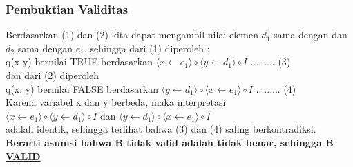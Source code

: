 \documentclass[handout]{beamer}
\theoremstyle{definition}
\theoremstyle{example}
\begin{document}
\begin{frame}
	\frametitle{Pembuktian Validitas}
	Berdasarkan (1) dan (2) kita dapat mengambil nilai elemen $d_1$ sama dengan dan $d_2$ sama dengan $e_1$, sehingga dari (1) diperoleh :\\
	\vspace{2mm}
	q(x y) bernilai TRUE berdasarkan $\langle x \leftarrow e_1 \rangle \circ \langle y \leftarrow d_1 \rangle \circ I $ ......... (3)\\
	dan dari (2) diperoleh\\
	 q(x, y) bernilai FALSE berdasarkan $\langle y \leftarrow d_1 \rangle \circ \langle x \leftarrow e_1 \rangle \circ I $ ......... (4)\\
	 Karena variabel x dan y berbeda, maka interpretasi\\
	 $\langle x \leftarrow e_1 \rangle \circ \langle y \leftarrow d_1 \rangle \circ I $ dan $\langle y \leftarrow d_1 \rangle \circ \langle x \leftarrow e_1 \rangle \circ I $\\
	 adalah identik, sehingga terlihat bahwa (3) dan (4) saling berkontradiksi.\\
	 \vspace{5mm}
	 \textbf{Berarti asumsi bahwa B tidak valid adalah tidak benar, sehingga B \underline{VALID}} 
\end{frame}									
\end{document}
